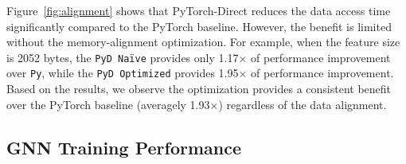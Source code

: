 Figure~\ref{fig:alignment} shows that PyTorch-Direct reduces the data access time significantly compared to the PyTorch baseline.
However, the benefit is limited without the memory-alignment optimization.
For example, when the feature size is 2052 bytes, the \texttt{PyD Naïve}  provides only 1.17$\times$ of performance improvement over \texttt{Py}, while the \texttt{PyD Optimized} provides 1.95$\times$ of performance improvement.
Based on the results, we observe the optimization provides a consistent benefit over the PyTorch baseline (averagely 1.93$\times$) regardless of the data alignment.


\subsection{GNN Training Performance}


